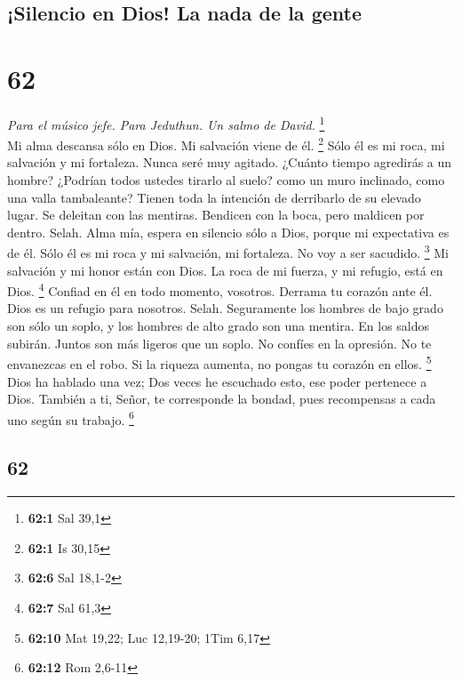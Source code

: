 \begin{paracol}{2}
{\subsection{¡Silencio en Dios! La nada de la
gente}\label{silencio-en-dios-la-nada-de-la-gente}}

\hypertarget{section-122}{%
\section{62}\label{section-122}}

\emph{Para el músico jefe. Para Jeduthun. Un salmo de David.}
\footnote{\textbf{62:1} Sal 39,1}\\
 Mi alma descansa sólo en Dios. Mi salvación viene de él.
\footnote{\textbf{62:1} Is 30,15}  Sólo él es mi roca, mi
salvación y mi fortaleza. Nunca seré muy agitado.  ¿Cuánto
tiempo agredirás a un hombre? ¿Podrían todos ustedes tirarlo al suelo?
como un muro inclinado, como una valla tambaleante? 
Tienen toda la intención de derribarlo de su elevado lugar. Se deleitan
con las mentiras. Bendicen con la boca, pero maldicen por dentro. Selah.
 Alma mía, espera en silencio sólo a Dios, porque mi
expectativa es de él.  Sólo él es mi roca y mi salvación,
mi fortaleza. No voy a ser sacudido. \footnote{\textbf{62:6} Sal 18,1-2}
 Mi salvación y mi honor están con Dios. La roca de mi
fuerza, y mi refugio, está en Dios. \footnote{\textbf{62:7} Sal 61,3}
 Confiad en él en todo momento, vosotros. Derrama tu
corazón ante él. Dios es un refugio para nosotros. Selah. 
Seguramente los hombres de bajo grado son sólo un soplo, y los hombres
de alto grado son una mentira. En los saldos subirán. Juntos son más
ligeros que un soplo.  No confíes en la opresión. No te
envanezcas en el robo. Si la riqueza aumenta, no pongas tu corazón en
ellos. \footnote{\textbf{62:10} Mat 19,22; Luc 12,19-20; 1Tim 6,17}
 Dios ha hablado una vez; Dos veces he escuchado esto,
ese poder pertenece a Dios.  También a ti, Señor, te
corresponde la bondad, pues recompensas a cada uno según su trabajo.
\footnote{\textbf{62:12} Rom 2,6-11}

\switchcolumn
\begin{otherlanguage}{english}

\hypertarget{section-123}{%
\section{62}\label{section-123}}


\end{otherlanguage}
\end{paracol}
